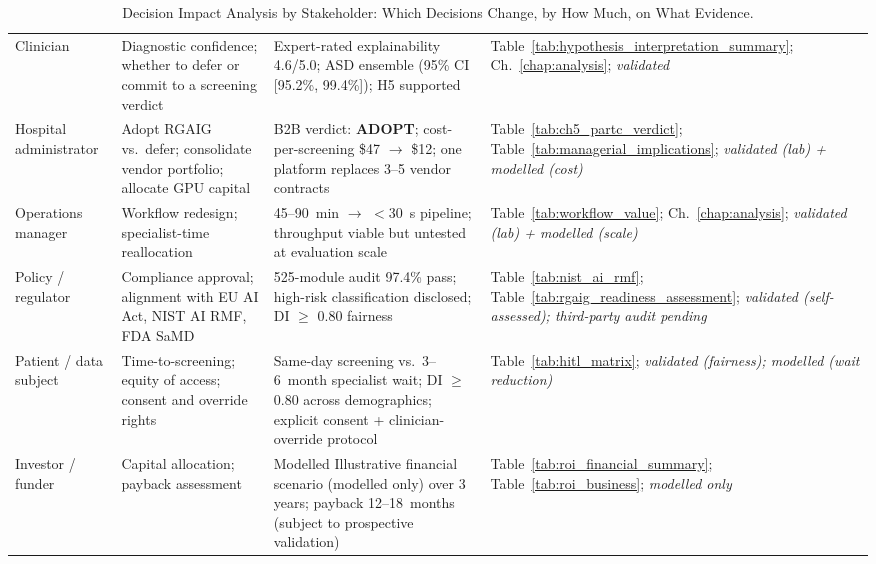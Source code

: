 {\tablestripes\tablefontsize
{}
\begin{xltabular}{\textwidth}{@{} >{\raggedright\arraybackslash}p{2.1cm} p{3.8cm} p{4.8cm} >{\raggedright\arraybackslash}p{3.4cm} @{}}
\caption[Decision Impact Analysis by Stakeholder: Which Decisions]{Decision Impact Analysis by Stakeholder: Which Decisions Change, by How Much, on What Evidence.}\label{tab:decision_impact_by_stakeholder} \\
\toprule
{} &  &  &  \\
\midrule
\endfirsthead
\endhead
\bottomrule
\endlastfoot
Clinician & Diagnostic confidence; whether to defer or commit to a screening verdict & Expert-rated explainability 4.6/5.0; ASD ensemble \asdacc{} (95\% CI [95.2\%, 99.4\%]); H5 supported & Table~\ref{tab:hypothesis_interpretation_summary}; \mbox{Ch.~\ref{chap:analysis}}; \emph{validated} \\
\addlinespace
Hospital administrator & Adopt RGAIG vs.\ defer; consolidate vendor portfolio; allocate GPU capital & B2B verdict: \textbf{ADOPT}; cost-per-screening \$47 $\to$ \$12; one platform replaces 3--5 vendor contracts & Table~\ref{tab:ch5_partc_verdict}; Table~\ref{tab:managerial_implications}; \emph{validated (lab) + modelled (cost)} \\
\addlinespace
Operations manager & Workflow redesign; specialist-time reallocation & 45--90~min $\to$ $<$30~s pipeline; throughput viable but untested at evaluation scale & Table~\ref{tab:workflow_value}; \mbox{Ch.~\ref{chap:analysis}}; \emph{validated (lab) + modelled (scale)} \\
\addlinespace
Policy / regulator & Compliance approval; alignment with EU AI Act, NIST AI RMF, FDA SaMD & 525-module audit 97.4\% pass; high-risk classification disclosed; DI $\geq$ 0.80 fairness & Table~\ref{tab:nist_ai_rmf}; Table~\ref{tab:rgaig_readiness_assessment}; \emph{validated (self-assessed); third-party audit pending} \\
\addlinespace
Patient / data subject & Time-to-screening; equity of access; consent and override rights & Same-day screening vs.\ 3--6~month specialist wait; DI $\geq$ 0.80 across demographics; explicit consent + clinician-override protocol & Table~\ref{tab:hitl_matrix}; \emph{validated (fairness); modelled (wait reduction)} \\
\addlinespace
Investor / funder & Capital allocation; payback assessment & Modelled Illustrative financial scenario (modelled only) over 3 years; payback 12--18~months (subject to prospective validation) & Table~\ref{tab:roi_financial_summary}; Table~\ref{tab:roi_business}; \emph{modelled only} \\
\end{xltabular}}

